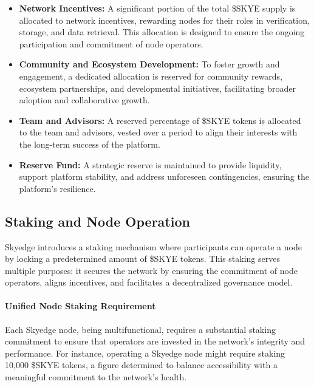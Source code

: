 \documentclass{article}
\begin{document}
\begin{itemize}
    \item \textbf{Network Incentives:} A significant portion of the total \$SKYE supply is allocated to network incentives, rewarding nodes for their roles in verification, storage, and data retrieval. This allocation is designed to ensure the ongoing participation and commitment of node operators.
    \item  \textbf{Community and Ecosystem Development:} To foster growth and engagement, a dedicated allocation is reserved for community rewards, ecosystem partnerships, and developmental initiatives, facilitating broader adoption and collaborative growth.
    \item \textbf{Team and Advisors:} A reserved percentage of \$SKYE tokens is allocated to the team and advisors, vested over a period to align their interests with the long-term success of the platform.
    \item \textbf{Reserve Fund:} A strategic reserve is maintained to provide liquidity, support platform stability, and address unforeseen contingencies, ensuring the platform's resilience.
\end{itemize}

\subsection{Staking and Node Operation}
Skyedge introduces a staking mechanism where participants can operate a node by locking a predetermined amount of \$SKYE tokens. This staking serves multiple purposes: it secures the network by ensuring the commitment of node operators, aligns incentives, and facilitates a decentralized governance model.

\paragraph{Unified Node Staking Requirement} Each Skyedge node, being multifunctional, requires a substantial staking commitment to ensure that operators are invested in the network's integrity and performance. For instance, operating a Skyedge node might require staking 10,000 \$SKYE tokens, a figure determined to balance accessibility with a meaningful commitment to the network's health.
\end{document}

